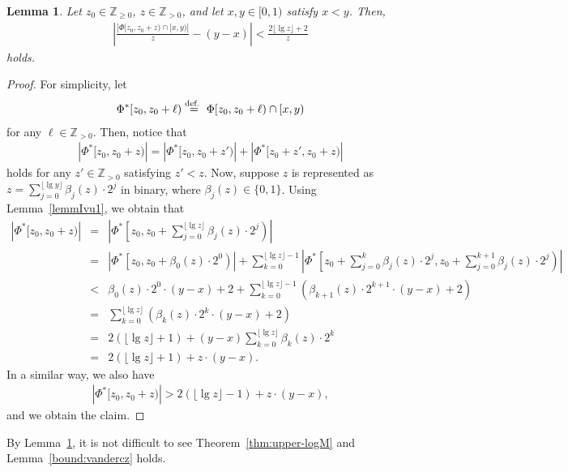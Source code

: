 \documentclass[letter, 11pt]{article}
\newcommand{\defeq}{\stackrel{\mbox{\scriptsize{\normalfont\rmfamily def. }}}{=}}
\newcommand{\1}{\mbox{1}\hspace{-0.25em}\mbox{l}}
\newtheorem{lemma}[theorem]{Lemma}
\begin{document}
\begin{lemma}\label{theoIvu3}
 Let $z_0 \in \mathbb{Z}_{\geq 0}$, $z \in \mathbb{Z}_{> 0}$, and let $x,y \in [0,1)$ satisfy $x<y$. 
 Then, 
\begin{eqnarray*}
\left|\frac{\left| \Phi[z_0, z_0+z) \cap [x,y)\right|}{z} - (y-x) \right| < \frac{2 \lfloor \lg z \rfloor + 2}{z} 
\end{eqnarray*}
  holds. \end{lemma}
\begin{proof}
 For simplicity, 
  let 
\begin{eqnarray*}
  \Phi^*[z_0, z_0+ \ell ) \defeq \Phi[z_0, z_0+ \ell ) \cap [x,y)  
\end{eqnarray*}
 for any $ \ell  \in \mathbb{Z}_{>0}$. 
 Then, notice that 
\begin{eqnarray}
|\Phi^*[z_0, z_0+z)| 
= \left|\Phi^*[z_0, z_0+z') \right| + \left|\Phi^*[z_0+z', z_0+z) \right|
\label{eq:sep-Psi}
\end{eqnarray}
  holds for any $z' \in \mathbb{Z}_{> 0}$ satisfying $z' < z$. 
 Now, suppose $z$ is represented as 
  $z=\sum_{j=0}^{\lfloor \lg y \rfloor} \beta_j(z) \cdotp 2^j$ in binary, 
  where $\beta_j(z) \in \{0,1\}$. 
 Using Lemma~\ref{lemmIvu1}, we obtain that 
\begin{eqnarray*}
|\Phi^*[z_0, z_0+z)|&=& 
  \left|\Phi^*\left[z_0, z_0+\sum_{j=0}^{\lfloor \lg z \rfloor} \beta_j(z) \cdotp 2^j \right)\right| \\
&=& 
    \left|\Phi^*\left[ z_0, z_0+\beta_0(z) \cdotp 2^0\right) \right| 
    +\sum_{k=0}^{\lfloor \lg z \rfloor-1} 
     \left|\Phi^*\left[ z_0+\sum_{j=0}^{k}\beta_j(z) \cdotp 2^j, z_0+\sum_{j=0}^{k+1}\beta_j(z) \cdotp 2^j\right) \right|\\
 &<& \beta_0(z) \cdotp 2^0 \cdotp (y-x)+2 
    +\sum_{k=0}^{\lfloor \lg z \rfloor-1}  \left( \beta_{k+1}(z) \cdotp 2^{k+1} \cdotp (y-x) + 2 \right) \\
 &=& \sum_{k=0}^{\lfloor \lg z \rfloor}  \left( \beta_k(z) \cdotp 2^k \cdotp (y-x) + 2 \right) \\
 &=& 2 (\lfloor \lg z \rfloor+1) + (y-x) \sum_{k=0}^{\lfloor \lg z \rfloor} \beta_k(z) \cdotp 2^k\\
 &=& 2 (\lfloor \lg z \rfloor+1) + z \cdotp (y-x). 
\end{eqnarray*}
 In a similar way, 
  we also have 
\begin{eqnarray*}
|\Phi^*[z_0, z_0+z)| > 2 (\lfloor \lg z \rfloor-1) + z \cdotp (y-x), 
\end{eqnarray*}
 and we obtain the claim. 
\end{proof}
By Lemma~\ref{theoIvu3}, it is not difficult to see 
 Theorem~\ref{thm:upper-logM} and Lemma~\ref{bound:vandercz} holds. 
\end{document}
